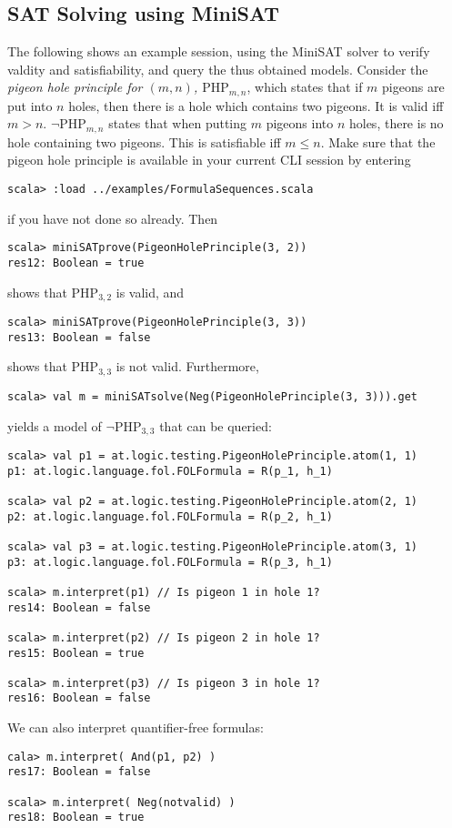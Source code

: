 \documentclass[a4paper,11pt]{article}
\begin{document}
\subsection{SAT Solving using MiniSAT}
%
The following shows an example session, using the MiniSAT solver
to verify valdity and satisfiability, and query the thus obtained models.
Consider the {\em pigeon hole principle for $(m, n)$, $\mathrm{PHP}_{m,n}$}, which states that if $m$ pigeons
are put into $n$ holes, then there is a hole which contains two pigeons. It is valid
iff $m>n$. $\neg\mathrm{PHP}_{m,n}$ states that when putting $m$ pigeons into $n$ holes, there
is no hole containing two pigeons. This is satisfiable iff $m\leq n$. Make sure
that the pigeon hole principle is available in your current CLI session 
by entering
\begin{lstlisting}
scala> :load ../examples/FormulaSequences.scala
\end{lstlisting}
if you have not done so already. Then
\begin{lstlisting}
scala> miniSATprove(PigeonHolePrinciple(3, 2))
res12: Boolean = true
\end{lstlisting}
shows that $\mathrm{PHP}_{3,2}$ is valid, and
\begin{lstlisting}
scala> miniSATprove(PigeonHolePrinciple(3, 3))
res13: Boolean = false
\end{lstlisting}
shows that $\mathrm{PHP}_{3,3}$ is not valid.
Furthermore,
\begin{lstlisting}
scala> val m = miniSATsolve(Neg(PigeonHolePrinciple(3, 3))).get
\end{lstlisting}
yields a model of $\neg\mathrm{PHP}_{3,3}$ that can be queried:
\begin{lstlisting}
scala> val p1 = at.logic.testing.PigeonHolePrinciple.atom(1, 1)
p1: at.logic.language.fol.FOLFormula = R(p_1, h_1)

scala> val p2 = at.logic.testing.PigeonHolePrinciple.atom(2, 1)
p2: at.logic.language.fol.FOLFormula = R(p_2, h_1)

scala> val p3 = at.logic.testing.PigeonHolePrinciple.atom(3, 1)
p3: at.logic.language.fol.FOLFormula = R(p_3, h_1)

scala> m.interpret(p1) // Is pigeon 1 in hole 1?
res14: Boolean = false

scala> m.interpret(p2) // Is pigeon 2 in hole 1?
res15: Boolean = true

scala> m.interpret(p3) // Is pigeon 3 in hole 1?
res16: Boolean = false
\end{lstlisting}
We can also interpret quantifier-free formulas:
\begin{lstlisting}
cala> m.interpret( And(p1, p2) )
res17: Boolean = false

scala> m.interpret( Neg(notvalid) )
res18: Boolean = true
\end{lstlisting}
\end{document}
